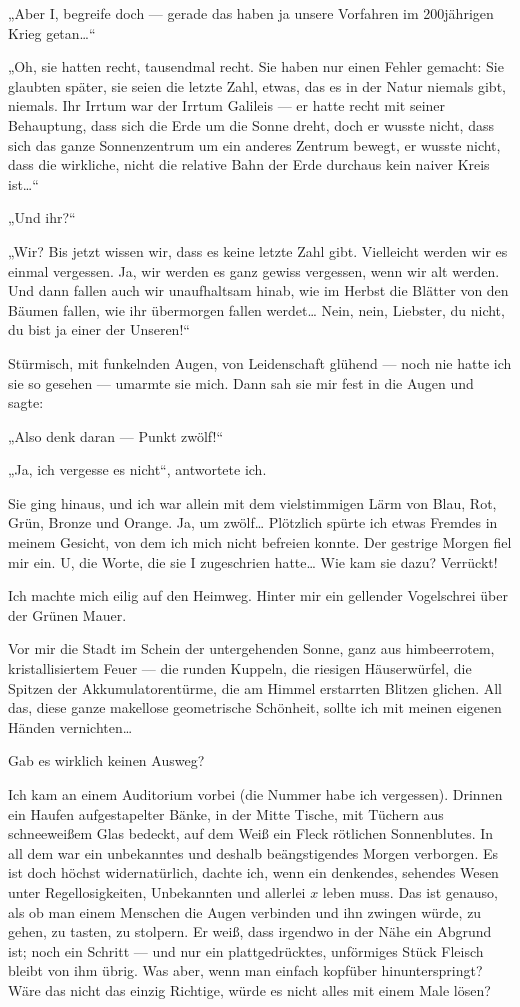 „Aber I, begreife doch — gerade das haben ja unsere Vorfahren im
200jährigen Krieg getan\ldots{}“

„Oh, sie hatten recht, tausendmal
recht. Sie haben nur einen Fehler gemacht: Sie glaubten später, sie
seien die letzte Zahl, etwas, das es in der Natur niemals gibt,
niemals. Ihr Irrtum war der Irrtum Galileis — er hatte recht mit
seiner Behauptung, dass sich die Erde um die Sonne dreht, doch er
wusste nicht, dass sich das ganze Sonnenzentrum um ein anderes
Zentrum bewegt, er wusste nicht, dass die wirkliche, nicht die
relative Bahn der Erde durchaus kein naiver Kreis ist\ldots{}“

„Und ihr?“

„Wir? Bis jetzt wissen wir, dass es keine letzte Zahl gibt.
Vielleicht werden wir es einmal vergessen. Ja, wir werden es ganz
gewiss vergessen, wenn wir alt werden. Und dann fallen auch wir
unaufhaltsam hinab, wie im Herbst die Blätter von den Bäumen
fallen, wie ihr übermorgen fallen werdet\ldots{} Nein, nein, Liebster,
du nicht, du bist ja einer der Unseren!“

Stürmisch, mit funkelnden Augen, von Leidenschaft glühend — noch
nie hatte ich sie so gesehen — umarmte sie mich. Dann sah sie mir
fest in die Augen und sagte:

„Also denk daran — Punkt zwölf!“

„Ja, ich vergesse es nicht“, antwortete ich.

Sie ging hinaus, und ich war allein mit dem
vielstimmigen Lärm von Blau, Rot, Grün, Bronze und Orange. Ja, um
zwölf\ldots{} Plötzlich spürte ich etwas Fremdes in meinem Gesicht, von
dem ich mich nicht befreien konnte. Der gestrige Morgen fiel mir
ein. U, die Worte, die sie I zugeschrien hatte\ldots{} Wie kam sie dazu?
Verrückt!

Ich machte mich eilig auf den Heimweg. Hinter mir ein
gellender Vogelschrei über der Grünen Mauer.

Vor mir die Stadt im
Schein der untergehenden Sonne, ganz aus himbeerrotem,
kristallisiertem Feuer — die runden Kuppeln, die riesigen
Häuserwürfel, die Spitzen der Akkumulatorentürme, die am Himmel
erstarrten Blitzen glichen. All das, diese ganze makellose
geometrische Schönheit, sollte ich mit meinen eigenen Händen
vernichten\ldots{}

Gab es wirklich keinen Ausweg?

Ich kam an einem Auditorium vorbei (die Nummer habe ich vergessen).
Drinnen ein Haufen aufgestapelter Bänke, in der Mitte Tische, mit
Tüchern aus schneeweißem Glas bedeckt, auf dem Weiß ein Fleck
rötlichen Sonnenblutes. In all dem war ein unbekanntes und deshalb
beängstigendes Morgen verborgen. Es ist doch höchst widernatürlich,
dachte ich, wenn ein denkendes, sehendes Wesen unter
Regellosigkeiten, Unbekannten und allerlei $x$ leben muss. Das ist
genauso, als ob man einem Menschen die Augen verbinden und ihn
zwingen würde, zu gehen, zu tasten, zu stolpern. Er weiß, dass
irgendwo in der Nähe ein Abgrund ist; noch ein Schritt — und nur
ein plattgedrücktes, unförmiges Stück Fleisch bleibt von ihm übrig.
Was aber, wenn man einfach kopfüber hinunterspringt? Wäre das nicht
das einzig Richtige, würde es nicht alles mit einem Male lösen?

